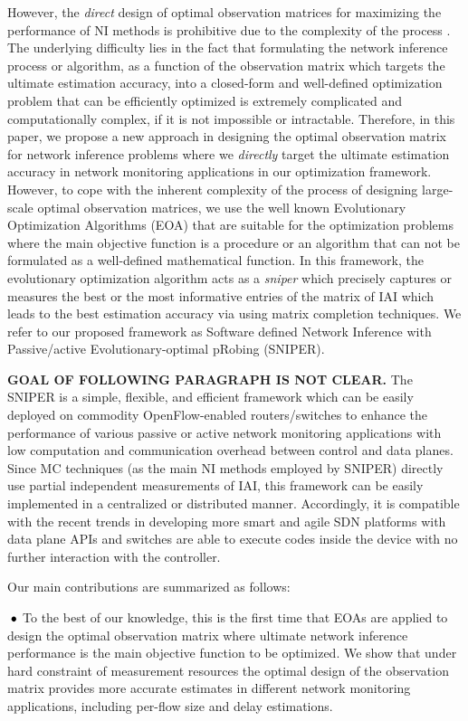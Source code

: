 However, the \emph{direct} design of optimal observation matrices for
maximizing the performance of NI methods is prohibitive due to the
complexity of the process \cite{IF14iSTAMP:2014}\cite{Elad:2007}. The
underlying difficulty lies in the fact that formulating the network
inference process or algorithm, as a function of the observation
matrix which targets the ultimate estimation accuracy, into a
closed-form and well-defined optimization problem that can be
efficiently optimized is extremely complicated and computationally
complex, if it is not impossible or intractable. Therefore, in this
paper, we propose a new approach in designing the optimal observation
matrix for network inference problems where we \emph{directly} target
the ultimate estimation accuracy in network monitoring applications in
our optimization framework. However, to cope with the inherent
complexity of the process of designing large-scale optimal observation
matrices, we use the well known Evolutionary Optimization Algorithms
(EOA) that are suitable for the optimization problems where the main
objective function is a procedure or an algorithm that can not be
formulated as a well-defined mathematical function. In this framework,
the evolutionary optimization algorithm acts as a \emph{sniper} which
precisely captures or measures the best or the most informative
entries of the matrix of IAI which leads to the best estimation
accuracy via using matrix completion techniques. We refer to our proposed framework as Software defined Network
Inference with Passive/active Evolutionary-optimal pRobing
(SNIPER). 

{\bf GOAL OF FOLLOWING PARAGRAPH IS NOT CLEAR.}
The SNIPER is a simple, flexible, and efficient framework
which can be easily deployed on commodity OpenFlow-enabled
routers/switches to enhance the performance of various passive or
active network monitoring applications with low computation and
communication overhead between control and data planes. Since MC
techniques (as the main NI methods employed by SNIPER) directly use
partial independent measurements of IAI, this framework can be easily
implemented in a centralized or distributed manner. Accordingly, it is
compatible with the recent trends in developing more smart and agile
SDN platforms \cite{Bianchi:2014}\cite{Moshref:2014} with data plane
APIs and switches are able to execute codes inside the device with no
further interaction with the controller.

Our main contributions are summarized as follows:

\textbf{$\text{\hspace{0.1cm}}\bullet$} To the best of our knowledge,
this is the first time that EOAs are applied to design the optimal
observation matrix where ultimate network inference performance is the
main objective function to be optimized. We show that under hard
constraint of measurement resources the optimal design of the
observation matrix provides more accurate estimates in different
network monitoring applications, including per-flow size and delay
estimations.

